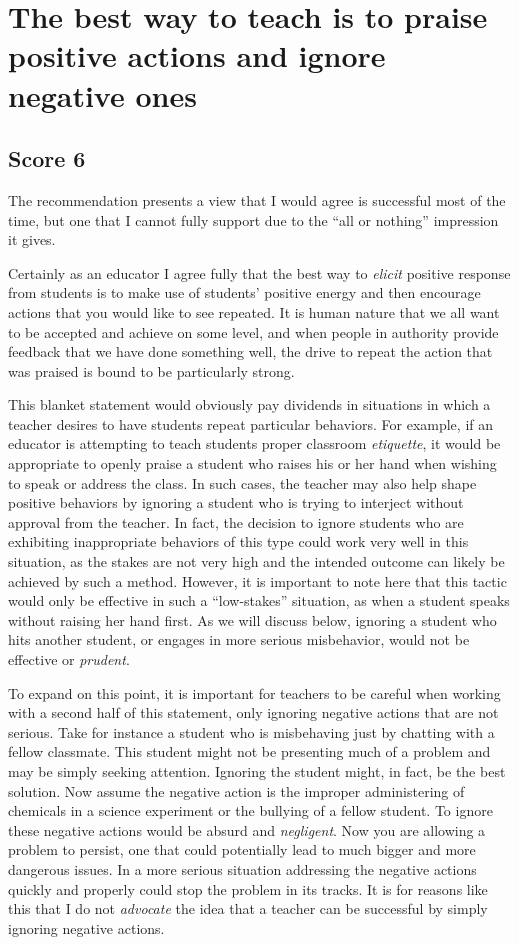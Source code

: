 \chapter{The best way to teach is to praise positive actions and ignore negative ones}

\section{Score 6}
The recommendation presents a view that I would agree is successful most of the time, but one that I cannot fully support due to the ``all or nothing'' impression it gives.

Certainly as an educator I agree fully that the best way to \emph{elicit} positive response from students is to make use of students' positive energy and then encourage actions that you would like to see repeated.
It is human nature that we all want to be accepted and achieve on some level, and when people in authority provide feedback that we have done something well, the drive to repeat the action that was praised is bound to be particularly strong.

This blanket statement would obviously pay dividends in situations in which a teacher desires to have students repeat particular behaviors.
For example, if an educator is attempting to teach students proper classroom \emph{etiquette}, it would be appropriate to openly praise a student who raises his or her hand when wishing to speak or address the class.
In such cases, the teacher may also help shape positive behaviors by ignoring a student who is trying to interject without approval from the teacher.
In fact, the decision to ignore students who are exhibiting inappropriate behaviors of this type could work very well in this situation, as the stakes are not very high and the intended outcome can likely be achieved by such a method.
However, it is important to note here that this tactic would only be effective in such a ``low-stakes'' situation, as when a student speaks without raising her hand first.
As we will discuss below, ignoring a student who hits another student, or engages in more serious misbehavior, would not be effective or \emph{prudent}.

To expand on this point, it is important for teachers to be careful when working with a second half of this statement, only ignoring negative actions that are not serious.
Take for instance a student who is misbehaving just by chatting with a fellow classmate.
This student might not be presenting much of a problem and may be simply seeking attention.
Ignoring the student might, in fact, be the best solution.
Now assume the negative action is the improper administering of chemicals in a science experiment or the bullying of a fellow student.
To ignore these negative actions would be absurd and \emph{negligent}.
Now you are allowing a problem to persist, one that could potentially lead to much bigger and more dangerous issues.
In a more serious situation addressing the negative actions quickly and properly could stop the problem in its tracks.
It is for reasons like this that I do not \emph{advocate} the idea that a teacher can be successful by simply ignoring negative actions.

